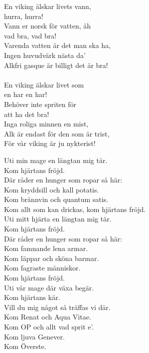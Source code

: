 \documentclass[a6paper, 10pt, twoside]{article}
\begin{document}
\newpage
\begin{center}
\end{center}
\begin{lyrics}
En viking älskar livets vann,\\
hurra, hurra! \\
Vann er norsk för vatten, åh \\
vad bra, vad bra! \\
Varenda vatten är det man ska ha, \\
Ingen huvudvärk nästa da’ \\
Alkfri gasque är billigt det är bra! \\
\vspace{5pt} \\
En viking älskar livet som \\
en har en har! \\
Behöver inte spriten för \\
att ha det bra! \\
Inga roliga minnen en mist, \\
Alk är endast för den som är trist,\\
För vår viking är ju nykterist!
\end{lyrics}
\noindent
\begin{center}
\end{center}
\begin{lyrics}
Uti min mage en längtan mig tär. \\
Kom hjärtans fröjd. \\
Där råder en hunger som ropar så här: \\
Kom kryddsill och kall potatis. \\
Kom brännvin och quantum satis. \\
Kom allt som kan drickas, kom hjärtans fröjd. 
\vspace{5pt}\\
Uti mitt hjärta en längtan mig tär. \\
Kom hjärtans fröjd. \\
Där råder en hunger som ropar så här: \\
Kom famnande lena armar. \\
Kom läppar och sköna barmar. \\
Kom fagraste människor. \\
Kom hjärtans fröjd. 
\vspace{5pt}\\
Uti vår mage där växa begär. \\
Kom hjärtans kär. \\
Vill du mig något så träffas vi där. \\
Kom Renat och Aqua Vitae. \\
Kom OP och allt vad sprit e'. \\
Kom ljuva Genever. \\
Kom Överste. 
\end{lyrics}
\end{document}

